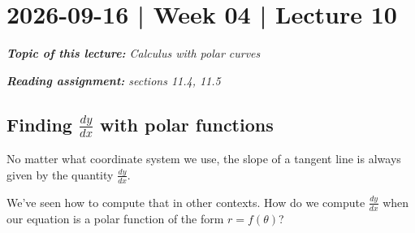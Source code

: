 \documentclass[10pt]{article}
\theoremstyle{definition}
\newtheorem{example}[theorem]{Example}
\renewenvironment{example}
{\begin{oldexample}}
  {\par\smallskip\hfill   End of Example~\theexample. $\square$    \par\end{oldexample}}
\newcommand{\1}[1]{\textbf{1}_{\left[#1\right]}} %
\begin{document}


\newpage
\section{2026-09-16 | Week 04 | Lecture 10}
\begin{center}
  \begin{tcolorbox}[width=0.9\textwidth, colback=white, colframe=black]
    \textit{\textbf{Topic of this lecture:} Calculus with polar curves}

    \textit{\textbf{Reading assignment:} sections 11.4, 11.5}
  \end{tcolorbox}
\end{center}


\subsection{Finding $\frac{dy}{dx}$ with polar functions}
No matter what coordinate system we use, the slope of a tangent line is always given by the quantity $\frac{dy}{dx}$.

We've seen how to compute that in other contexts. How do we compute $\frac{dy}{dx}$ when our equation is
a polar function of the form $r = f(\theta)$?
\end{document}
